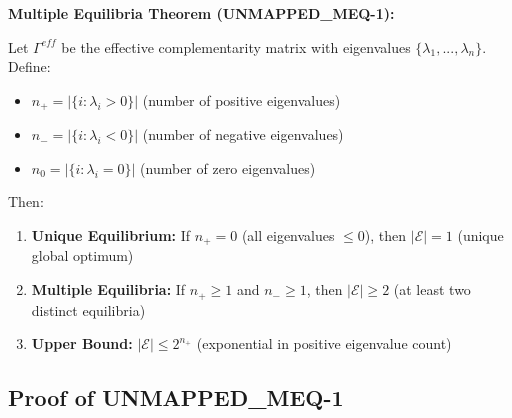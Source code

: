 \begin{tcolorbox}[colback=red!5!white, colframe=red!75!black,
    title=Theorem UNMAPPED_MEQ-1: Existence of Multiple Equilibria]

\textbf{Multiple Equilibria Theorem (UNMAPPED_MEQ-1):}

Let $\Gamma^{eff}$ be the effective complementarity matrix with eigenvalues
$\{\lambda_1, ..., \lambda_n\}$. Define:
\begin{itemize}[nosep]
    \item $n_+ = |\{i : \lambda_i > 0\}|$ (number of positive eigenvalues)
    \item $n_- = |\{i : \lambda_i < 0\}|$ (number of negative eigenvalues)
    \item $n_0 = |\{i : \lambda_i = 0\}|$ (number of zero eigenvalues)
\end{itemize}

Then:

\begin{enumerate}
    \item \textbf{Unique Equilibrium:} If $n_+ = 0$ (all eigenvalues $\leq 0$),
          then $|\mathcal{E}| = 1$ (unique global optimum)

    \item \textbf{Multiple Equilibria:} If $n_+ \geq 1$ and $n_- \geq 1$, then
          $|\mathcal{E}| \geq 2$ (at least two distinct equilibria)

    \item \textbf{Upper Bound:} $|\mathcal{E}| \leq 2^{n_+}$ (exponential in
          positive eigenvalue count)
\end{enumerate}

\end{tcolorbox}

\subsection{Proof of UNMAPPED_MEQ-1}


